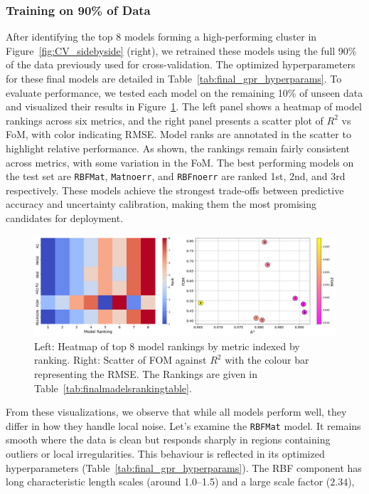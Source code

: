 \documentclass[12pt]{article}
\begin{document}
\subsubsection*{Training on 90\% of Data}
After identifying the top 8 models forming a high-performing cluster in Figure~\ref{fig:CV_sidebyside} (right),
we retrained these models using the full 90\% of the data previously used for cross-validation. The optimized hyperparameters for these final models are detailed in Table~\ref{tab:final_gpr_hyperparams}. 
To evaluate performance, we tested each model on the remaining 10\% of unseen data and visualized their results in Figure~\ref{fig:comparing_metrics}.
The left panel shows a heatmap of model rankings across six metrics, and the right panel presents a scatter plot of $R^2$ vs FoM, with color indicating RMSE. 
Model ranks are annotated in the scatter to highlight relative performance.
As shown, the rankings remain fairly consistent across metrics, with some variation in the FoM. The best performing models on the test set are \texttt{RBFMat}, \texttt{Matnoerr}, and \texttt{RBFnoerr} are ranked 1st, 2nd, and 3rd respectively.
These models achieve the strongest trade-offs between predictive accuracy and uncertainty calibration, making them the most promising candidates for deployment.
\begin{figure}[H]
    \centering
    \includegraphics[width=\textwidth]{LatexPlots/final_gps_plots/metric_of_finalists_comparison.png}
    \caption{Left: Heatmap of top 8 model rankings by metric indexed by ranking.
    Right: Scatter of FOM against \(R^2\) with the colour bar representing the RMSE.
    The Rankings are given in Table~\ref{tab:finalmadelsrankingtable}.}
    \label{fig:comparing_metrics}
\end{figure}
From these visualizations, we observe that while all models perform well, they differ in how they handle local noise.
Let's examine the \texttt{RBFMat} model. It remains smooth where the data is clean but responds sharply in regions containing outliers or local irregularities.
This behaviour is reflected in its optimized hyperparameters (Table~\ref{tab:final_gpr_hyperparams}). The RBF component has long characteristic length scales (around 1.0--1.5) and a large scale factor ($2.34$),
\end{document}
